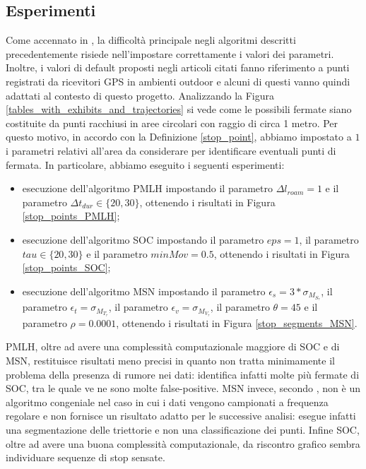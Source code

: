 \documentclass[12pt]{article}
\begin{document}
\newpage
\subsection{Esperimenti}
Come accennato in \cite{ReviewMethods}, la difficoltà principale negli algoritmi descritti precedentemente risiede nell'impostare correttamente i valori dei parametri.
Inoltre, i valori di default proposti negli articoli citati fanno riferimento a punti registrati da ricevitori GPS in ambienti outdoor e alcuni di questi vanno quindi adattati al contesto di questo progetto.
Analizzando la Figura \ref{tables_with_exhibits_and_trajectories} si vede come le possibili fermate siano costituite da punti racchiusi in aree circolari con raggio di circa 1 metro. 
Per questo motivo, in accordo con la Definizione \ref{stop_point}, abbiamo impostato a $1$ i parametri relativi all'area da considerare per identificare eventuali punti di fermata.
In particolare, abbiamo eseguito i seguenti esperimenti:
\begin{itemize}
    \item esecuzione dell'algoritmo PMLH impostando il parametro $\Delta l_{roam}=1$ e il parametro $\Delta t_{dur} \in \{20,30\}$, ottenendo i risultati in Figura \ref{stop_points_PMLH};
    \item esecuzione dell'algoritmo SOC impostando il parametro $eps=1$, il parametro $tau \in \{20,30\}$ e il parametro $minMov = 0.5$, ottenendo i risultati in Figura \ref{stop_points_SOC};
    \item esecuzione dell'algoritmo MSN impostando il parametro $\epsilon_s = 3*\sigma_{M_{S_\tau}}$, il parametro $\epsilon_t = \sigma_{M_{T_\tau}}$,  il parametro $\epsilon_v = \sigma_{M_{V_\tau}}$, il parametro $\theta=45$ e il parametro $\rho=0.0001$, ottenendo i risultati in Figura \ref{stop_segments_MSN}.
\end{itemize}
PMLH, oltre ad avere una complessità computazionale maggiore di SOC e di MSN, restituisce risultati meno precisi in quanto non tratta minimamente il problema della presenza di rumore nei dati: identifica infatti molte più fermate di SOC, tra le quale ve ne sono molte false-positive.
MSN invece, secondo \cite{Statistical}, non è un algoritmo congeniale nel caso in cui i dati vengono campionati a frequenza regolare e non fornisce un risultato adatto per le successive analisi: esegue infatti una segmentazione delle triettorie e non una classificazione dei punti.
Infine SOC, oltre ad avere una buona complessità computazionale, da riscontro grafico sembra individuare sequenze di stop sensate.
\end{document}
